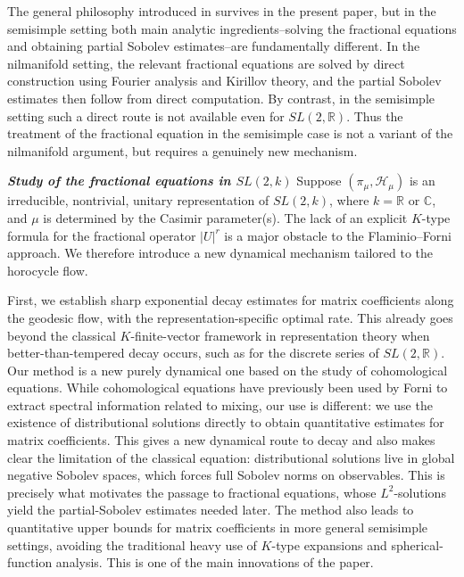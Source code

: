 \documentclass[11 pt]{amsart}
\newcommand{\RR}{\mathbb{R}}
\newcommand{\CC}{\mathbb{C}}
\theoremstyle{definition}
\numberwithin{equation}{section}
\begin{document}
The general philosophy introduced in \cite{W2} survives in the present paper, but in the semisimple setting both main analytic ingredients--solving the fractional equations and obtaining partial Sobolev estimates--are fundamentally different. In the nilmanifold setting, the relevant fractional equations are solved by direct construction using Fourier analysis and Kirillov theory, and the partial Sobolev estimates then follow from direct computation. By contrast, in the semisimple setting such a direct route is not available even for \(SL(2,\RR)\). Thus the treatment of the fractional equation in the semisimple case is not a variant of the nilmanifold argument, but requires a genuinely new mechanism.



\textbf{\emph{Study of the fractional equations in $SL(2,k)$}}  Suppose \((\pi_\mu,\mathcal H_\mu)\) is an irreducible, nontrivial, unitary representation  of \(SL(2,k)\), where \(k=\RR\) or \(\CC\), and \(\mu\) is determined by the Casimir parameter(s). The lack of an explicit \(K\)-type formula for the fractional operator \( |U|^r \) is a major obstacle to the Flaminio--Forni approach. We therefore introduce a new dynamical mechanism tailored to the horocycle flow.

First, we establish sharp exponential decay estimates for matrix
coefficients along the geodesic flow, with the representation-specific
optimal rate. This already goes beyond the classical \(K\)-finite-vector
framework in representation theory when better-than-tempered decay
occurs, such as for the discrete series of \(SL(2,\RR)\). Our method is
a new purely dynamical one based on the study of cohomological
equations. While cohomological equations have previously been used by
Forni to extract spectral information related to mixing, our use is different: we use the existence of
distributional solutions directly to obtain quantitative estimates for
matrix coefficients. This gives a new dynamical route to decay and also
makes clear the limitation of the classical equation: distributional
solutions live in global negative Sobolev spaces, which forces full
Sobolev norms on observables. This is precisely what motivates the
passage to fractional equations, whose \(L^2\)-solutions yield the
partial-Sobolev estimates needed later. The method also leads to
quantitative upper bounds for matrix coefficients in more general
semisimple settings, avoiding the traditional heavy use of \(K\)-type
expansions and spherical-function analysis. This is one of the main
innovations of the paper.
\end{document}
